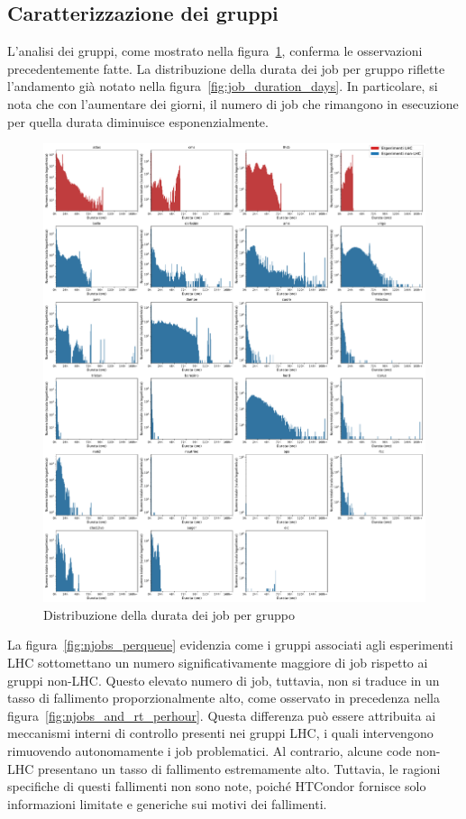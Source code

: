 \subsection{Caratterizzazione dei gruppi}

L'analisi dei gruppi, come mostrato nella
figura~\ref{fig:job_duration_perqueue}, conferma le osservazioni
precedentemente fatte. La distribuzione della durata dei job per gruppo
riflette l'andamento già notato nella figura~\ref{fig:job_duration_days}. In
particolare, si nota che con l'aumentare dei giorni, il numero di job che
rimangono in esecuzione per quella durata diminuisce esponenzialmente.

\begin{figure}[!p]
    \centering
    \includegraphics[width=\textwidth]{images/job_duration_perqueue}
    \caption{Distribuzione della durata dei job per gruppo}
    \label{fig:job_duration_perqueue}
\end{figure}

La figura~\ref{fig:njobs_perqueue} evidenzia come i gruppi associati agli
esperimenti LHC sottomettano un numero significativamente maggiore di job
rispetto ai gruppi non-LHC. Questo elevato numero di job, tuttavia, non si
traduce in un tasso di fallimento proporzionalmente alto, come osservato in
precedenza nella figura~\ref{fig:njobs_and_rt_perhour}. Questa differenza può
essere attribuita ai meccanismi interni di controllo presenti nei gruppi LHC,
i quali intervengono rimuovendo autonomamente i job problematici. Al
contrario, alcune code non-LHC presentano un tasso di fallimento estremamente
alto. Tuttavia, le ragioni specifiche di questi fallimenti non sono note,
poiché HTCondor fornisce solo informazioni limitate e generiche sui motivi dei
fallimenti.

